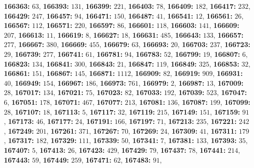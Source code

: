 \textsf{\bfseries 166363:} $63$, \textsf{\bfseries 166393:} $131$, \textsf{\bfseries 166399:} $221$, \textsf{\bfseries 166403:} $78$, \textsf{\bfseries 166409:} $182$, \textsf{\bfseries 166417:} $232$, \textsf{\bfseries 166429:} $247$, \textsf{\bfseries 166457:} $94$, \textsf{\bfseries 166471:} $150$, \textsf{\bfseries 166487:} $41$, \textsf{\bfseries 166541:} $12$, \textsf{\bfseries 166561:} $26$, \textsf{\bfseries 166567:} $112$, \textsf{\bfseries 166571:} $220$, \textsf{\bfseries 166597:} $86$, \textsf{\bfseries 166601:} $118$, \textsf{\bfseries 166603:} $141$, \textsf{\bfseries 166609:} $207$, \textsf{\bfseries 166613:} $11$, \textsf{\bfseries 166619:} $8$, \textsf{\bfseries 166627:} $18$, \textsf{\bfseries 166631:} $485$, \textsf{\bfseries 166643:} $133$, \textsf{\bfseries 166657:} $277$, \textsf{\bfseries 166667:} $380$, \textsf{\bfseries 166669:} $455$, \textsf{\bfseries 166679:} $63$, \textsf{\bfseries 166693:} $20$, \textsf{\bfseries 166703:} $237$, \textsf{\bfseries 166723:} $29$, \textsf{\bfseries 166739:} $277$, \textsf{\bfseries 166741:} $61$, \textsf{\bfseries 166781:} $94$, \textsf{\bfseries 166783:} $52$, \textsf{\bfseries 166799:} $19$, \textsf{\bfseries 166807:} $6$, \textsf{\bfseries 166823:} $134$, \textsf{\bfseries 166841:} $300$, \textsf{\bfseries 166843:} $21$, \textsf{\bfseries 166847:} $119$, \textsf{\bfseries 166849:} $325$, \textsf{\bfseries 166853:} $32$, \textsf{\bfseries 166861:} $151$, \textsf{\bfseries 166867:} $145$, \textsf{\bfseries 166871:} $1112$, \textsf{\bfseries 166909:} $82$, \textsf{\bfseries 166919:} $909$, \textsf{\bfseries 166931:} $40$, \textsf{\bfseries 166949:} $154$, \textsf{\bfseries 166967:} $186$, \textsf{\bfseries 166973:} $761$, \textsf{\bfseries 166979:} $2$, \textsf{\bfseries 166987:} $13$, \textsf{\bfseries 167009:} $28$, \textsf{\bfseries 167017:} $134$, \textsf{\bfseries 167021:} $75$, \textsf{\bfseries 167023:} $82$, \textsf{\bfseries 167033:} $192$, \textsf{\bfseries 167039:} $523$, \textsf{\bfseries 167047:} $6$, \textsf{\bfseries 167051:} $178$, \textsf{\bfseries 167071:} $467$, \textsf{\bfseries 167077:} $213$, \textsf{\bfseries 167081:} $136$, \textsf{\bfseries 167087:} $199$, \textsf{\bfseries 167099:} $28$, \textsf{\bfseries 167107:} $18$, \textsf{\bfseries 167113:} $5$, \textsf{\bfseries 167117:} $32$, \textsf{\bfseries 167119:} $215$, \textsf{\bfseries 167149:} $151$, \textsf{\bfseries 167159:} $91$, \textsf{\bfseries 167173:} $46$, \textsf{\bfseries 167177:} $24$, \textsf{\bfseries 167191:} $166$, \textsf{\bfseries 167197:} $71$, \textsf{\bfseries 167213:} $235$, \textsf{\bfseries 167221:} $242$, \textsf{\bfseries 167249:} $201$, \textsf{\bfseries 167261:} $371$, \textsf{\bfseries 167267:} $70$, \textsf{\bfseries 167269:} $24$, \textsf{\bfseries 167309:} $41$, \textsf{\bfseries 167311:} $179$, \textsf{\bfseries 167317:} $182$, \textsf{\bfseries 167329:} $111$, \textsf{\bfseries 167339:} $50$, \textsf{\bfseries 167341:} $7$, \textsf{\bfseries 167381:} $133$, \textsf{\bfseries 167393:} $35$, \textsf{\bfseries 167407:} $5$, \textsf{\bfseries 167413:} $26$, \textsf{\bfseries 167423:} $429$, \textsf{\bfseries 167429:} $79$, \textsf{\bfseries 167437:} $78$, \textsf{\bfseries 167441:} $214$, \textsf{\bfseries 167443:} $59$, \textsf{\bfseries 167449:} $259$, \textsf{\bfseries 167471:} $62$, \textsf{\bfseries 167483:} $91$, 

